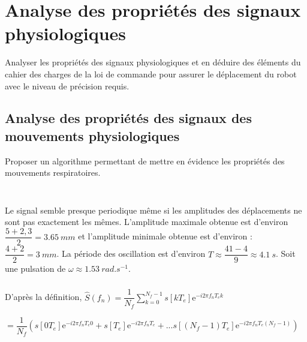 \documentclass[10pt,fleqn]{article} %
\begin{document}

\vspace{4.5cm}
\pagestyle{fancy}
\thispagestyle{plain}


\def\columnseprulecolor{\color{ocre}}
\setlength{\columnseprule}{0.4pt} 

\section{Analyse des propriétés des signaux physiologiques}

\begin{obj}
Analyser les propriétés des signaux physiologiques et en déduire des éléments du cahier des charges
de la loi de commande pour assurer le déplacement du robot avec le niveau de précision requis.
\end{obj}


\subsection{Analyse des propriétés des signaux des mouvements physiologiques}

\begin{obj}
Proposer un algorithme permettant de mettre en évidence les propriétés des mouvements respiratoires.
\end{obj}
\subparagraph{} ~\\ %

%
%
Le signal semble presque periodique même si les amplitudes des déplacements ne sont pas exactement les mêmes.
L'amplitude maximale obtenue est d'environ $\dfrac{5+2,3}{2}=\SI{3,65}{mm}$ et l'amplitude minimale obtenue est d'environ : $\dfrac{4+2}{2}=\SI{3}{mm}$. 
La période des oscillation est d'environ $
T\approx\dfrac{41-4}{9}\approx \SI{4,1}{s}$. 
Soit une pulsation de $\omega\approx \SI{1,53}{rad.s^{-1}}$.


\subparagraph{} %
D'après la définition, 
$\hat{S}\left( f_n\right)= \dfrac{1}{N_f} \sum \limits_{k=0}^{N_f-1} s\left[kT_e\right] \text{e}^{-i 2 \pi f_nT_e k}$

$= \dfrac{1}{N_f} \left(
 s\left[0 T_e\right] \text{e}^{-i 2 \pi f_nT_e 0} + 
 s\left[T_e\right] \text{e}^{-i 2 \pi f_nT_e } + ... 
 s\left[\left( N_f-1\right)T_e\right] \text{e}^{-i 2 \pi f_nT_e \left( N_f-1\right)}\right)$
\end{document}
